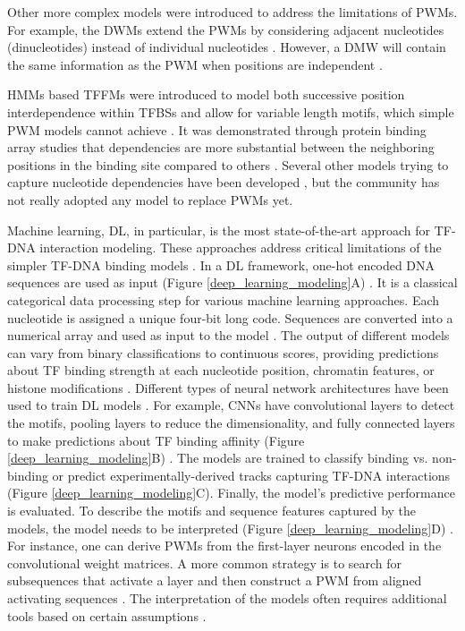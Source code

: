     Other more complex models were introduced to address the limitations of PWMs. For example, the \ac{DWMs} extend the PWMs by considering adjacent nucleotides (dinucleotides) instead of individual nucleotides \cite{siddharthan2010dinucleotide}. However, a DMW will contain the same information as the PWM when positions are independent \cite{siddharthan2010dinucleotide}.

    \ac{HMMs} based \ac{TFFMs} were introduced to model both successive position interdependence within TFBSs and allow for variable length motifs, which simple PWM models cannot achieve \cite{mathelier2013next}. It was demonstrated through protein binding array studies that dependencies are more substantial between the neighboring positions in the binding site compared to others \cite{zhao2012improved}. Several other models trying to capture nucleotide dependencies have been developed \cite{xing2002hierarchical,zhao2012improved,stormo2013modeling,santolini2014general}, but the community has not really adopted any model to replace PWMs yet.

    Machine learning, \ac{DL}, in particular, is the most state-of-the-art approach for TF-DNA interaction modeling. These approaches address critical limitations of the simpler TF-DNA binding models \cite{wang2022towards}. In a DL framework, one-hot encoded DNA sequences are used as input ({Figure \ref{deep_learning_modeling}}A) \cite{novakovsky2023obtaining}. It is a classical categorical data processing step for various machine learning approaches. Each nucleotide is assigned a unique four-bit long code. Sequences are converted into a numerical array and used as input to the model \cite{zeng2020review}. The output of different models can vary from binary classifications to continuous scores, providing predictions about TF binding strength at each nucleotide position, chromatin features, or histone modifications \cite{zeng2020review}. Different types of neural network architectures have been used to train DL models \cite{koido2024fundamentals}. For example, \ac{CNNs} have convolutional layers to detect the motifs, pooling layers to reduce the dimensionality, and fully connected layers to make predictions about TF binding affinity ({Figure \ref{deep_learning_modeling}}B) \cite{novakovsky2023obtaining}. The models are trained to classify binding vs. non-binding or predict experimentally-derived tracks capturing TF-DNA interactions ({Figure \ref{deep_learning_modeling}}C). Finally, the model's predictive performance is evaluated. To describe the motifs and sequence features captured by the models, the model needs to be interpreted ({Figure \ref{deep_learning_modeling}}D) \cite{novakovsky2023obtaining}. For instance, one can derive PWMs from the first-layer neurons encoded in the convolutional weight matrices. A more common strategy is to search for subsequences that activate a layer and then construct a PWM from aligned activating sequences \cite{novakovsky2023obtaining}. The interpretation of the models often requires additional tools based on certain assumptions \cite{novakovsky2023obtaining}.

